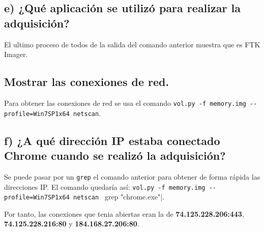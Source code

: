 \documentclass{article}
\begin{document}
\subsection{e) ¿Qué aplicación se utilizó para realizar la adquisición?}
El ultimo proceso de todos de la salida del comando anterior muestra que es FTK Imager.

\subsection{Mostrar las conexiones de red.}
Para obtener las conexiones de red se usa el comando \verb|vol.py -f memory.img --profile=Win7SP1x64 netscan|.

\subsection{f) ¿A qué dirección IP estaba conectado Chrome cuando se realizó la adquisición?}

Se puede pasar por un \verb|grep| el comando anterior para obtener de forma rápida las direcciones IP. El comando quedaría así: \verb|vol.py -f memory.img --profile=Win7SP1x64 netscan | grep "chrome.exe"|.


Por tanto, las conexiones que tenia abiertas eran la de \textbf{74.125.228.206:443}, \textbf{74.125.228.216:80} y \textbf{184.168.27.206:80}.
\end{document}
